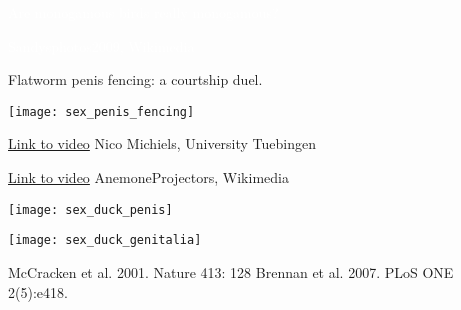 \documentclass[t]{beamer}
\newcommand{\backskip}{\vspace{-0.5\baselineskip}}
\begin{document}

{
\begin{frame}{\textcolor{white}{Are monogamous birds really monogamous?}}

\vfilll

\tiny \textcolor{white}{Sandysphotos2009, Wikimedia}
\end{frame}
}


\begin{frame}{Flatworm penis fencing: a courtship duel.}

\backskip

\centering

\texttt{[image: sex\_penis\_fencing]}

\vfilll

\tiny \href{https://www.youtube.com/watch?v=wn3xluIRh1Y}{Link to video} \hfill Nico Michiels, University Tuebingen


\end{frame}


{
\begin{frame}

\vfilll

\tiny \href{https://www.youtube.com/watch?v=dQs1cw25dqw}{Link to video} \hfill AnemoneProjectors, Wikimedia
\end{frame}
}


\begin{frame}

\begin{multicols}{2}

\centering

\texttt{[image: sex\_duck\_penis]}

\columnbreak

\texttt{[image: sex\_duck\_genitalia]}

\end{multicols}

\vfilll

\tiny McCracken et al. 2001. Nature 413: 128
\hfill 
Brennan et al. 2007. PLoS ONE 2(5):e418. 

\end{frame}

\end{document}
